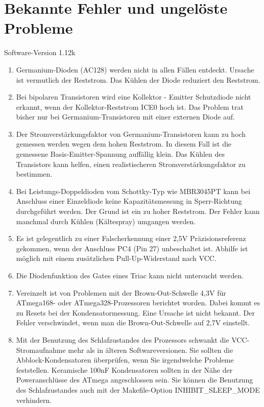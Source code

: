 
\chapter{Bekannte Fehler und ungelöste Probleme}
{\center Software-Version 1.12k}

\begin{enumerate}

\item Germanium-Dioden (AC128) werden nicht in allen Fällen entdeckt. Ursache ist vermutlich der Reststrom.
Das Kühlen der Diode reduziert den Reststrom.

\item Bei bipolaren Transistoren wird eine Kollektor - Emitter Schutzdiode nicht erkannt, wenn der
Kollektor-Reststrom ICE0 hoch ist. Das Problem trat bisher nur bei Germanium-Transistoren mit
einer externen Diode auf.

\item Der Stromverstärkungsfaktor von Germanium-Transistoren kann zu hoch gemessen werden wegen dem hohen Reststrom.
In diesem Fall ist die gemessene Basis-Emitter-Spannung auffällig klein.
Das Kühlen des Transistors kann helfen, einen realistischeren Stromverstärkungsfaktor zu bestimmen.

\item Bei Leistungs-Doppeldioden vom Schottky-Typ wie MBR3045PT kann bei Anschluss einer Einzeldiode keine Kapazitätsmessung in Sperr-Richtung 
durchgeführt werden. Der Grund ist ein zu hoher Reststrom. Der Fehler kann manchmal durch Kühlen (Kältespray) umgangen werden.

\item Es ist gelegentlich zu einer Falscherkennung einer 2,5V Präzisionsreferenz gekommen, wenn der Anschluss PC4 (Pin 27) unbeschaltet ist.
Abhilfe ist möglich mit einem zusätzlichen Pull-Up-Widerstand nach VCC.

\item Die Diodenfunktion des Gates eines Triac kann nicht untersucht werden.

\item Vereinzelt ist von Problemen mit der Brown-Out-Schwelle 4,3V für ATmega168- oder ATmega328-Prozessoren berichtet worden.
Dabei kommt es zu Resets bei der Kondensatormessung. Eine Ursache ist nicht bekannt.
Der Fehler verschwindet, wenn man die Brown-Out-Schwelle auf 2,7V einstellt.

\item Mit der Benutzung des Schlafzustandes des Prozessors schwankt die VCC-Stromaufnahme mehr als
in älteren Softwareversionen.
Sie sollten die Abblock-Kondensatoren überprüfen, wenn Sie irgendwelche Probleme feststellen.
Keramische 100nF Kondensatoren sollten in der Nähe der Poweranschlüsse des ATmega angeschlossen sein.
Sie können die Benutzung des Schlafzustandes auch mit der Makefile-Option INHIBIT\_SLEEP\_MODE verhindern.


\end{enumerate}
